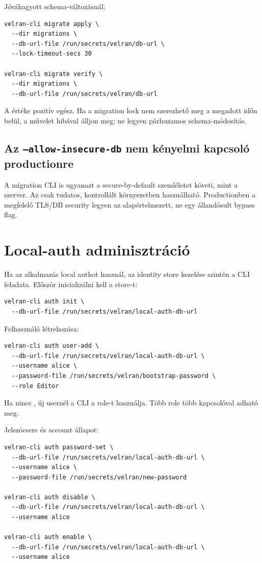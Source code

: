 Jóváhagyott schema-változásnál:

\begin{lstlisting}
velran-cli migrate apply \
  --dir migrations \
  --db-url-file /run/secrets/velran/db-url \
  --lock-timeout-secs 30

velran-cli migrate verify \
  --dir migrations \
  --db-url-file /run/secrets/velran/db-url
\end{lstlisting}

A \code{--lock-timeout-secs} értéke pozitív egész. Ha a migration lock nem szerezhető meg a megadott időn belül, a művelet hibával álljon meg; ne legyen párhuzamos schema-módosítás.

\subsection*{Az \texttt{--allow-insecure-db} nem kényelmi kapcsoló productionre}

A migration CLI is ugyanazt a secure-by-default szemléletet követi, mint a szerver. Az  csak tudatos, kontrollált környezetben használható. Productionben a megfelelő TLS/DB security legyen az alapértelmezett, ne egy állandósult bypass flag.

\section{Local-auth adminisztráció}

Ha az alkalmazás local authot használ, az identity store kezelése szintén a CLI feladata. Először inicializálni kell a store-t:

\begin{lstlisting}
velran-cli auth init \
  --db-url-file /run/secrets/velran/local-auth-db-url
\end{lstlisting}

Felhasználó létrehozása:

\begin{lstlisting}
velran-cli auth user-add \
  --db-url-file /run/secrets/velran/local-auth-db-url \
  --username alice \
  --password-file /run/secrets/velran/bootstrap-password \
  --role Editor
\end{lstlisting}

Ha nincs \code{--role}, új usernél a CLI a  role-t használja. Több role több  kapcsolóval adható meg.

Jelszócsere és account állapot:

\begin{lstlisting}
velran-cli auth password-set \
  --db-url-file /run/secrets/velran/local-auth-db-url \
  --username alice \
  --password-file /run/secrets/velran/new-password

velran-cli auth disable \
  --db-url-file /run/secrets/velran/local-auth-db-url \
  --username alice

velran-cli auth enable \
  --db-url-file /run/secrets/velran/local-auth-db-url \
  --username alice
\end{lstlisting}

